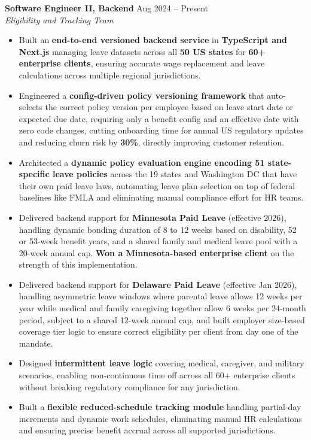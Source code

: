 \documentclass[11pt,a4paper]{article}
\begin{document}
\vspace{3pt}
\noindent\textbf{Software Engineer II, Backend} \hfill Aug 2024 -- Present \\
\textit{Eligibility and Tracking Team}\vspace{3pt}
\begin{itemize}[leftmargin=*, noitemsep, topsep=1pt, label={\small\textbullet}, itemsep=0pt]
\RaggedRight
    \item Built an \textbf{end-to-end versioned backend service} in \textbf{TypeScript and Next.js} managing leave datasets across all \textbf{50 US states} for \textbf{60+ enterprise clients}, ensuring accurate wage replacement and leave calculations across multiple regional jurisdictions.
    \item Engineered a \textbf{config-driven policy versioning framework} that auto-selects the correct policy version per employee based on leave start date or expected due date, requiring only a benefit config and an effective date with zero code changes, cutting onboarding time for annual US regulatory updates and reducing churn risk by \textbf{30\%}, directly improving customer retention.
    \item Architected a \textbf{dynamic policy evaluation engine encoding 51 state-specific leave policies} across the 19 states and Washington DC that have their own paid leave laws, automating leave plan selection on top of federal baselines like FMLA and eliminating manual compliance effort for HR teams.
    \item Delivered backend support for \textbf{Minnesota Paid Leave} (effective 2026), handling dynamic bonding duration of 8 to 12 weeks based on disability, 52 or 53-week benefit years, and a shared family and medical leave pool with a 20-week annual cap. \textbf{Won a Minnesota-based enterprise client} on the strength of this implementation.
    \item Delivered backend support for \textbf{Delaware Paid Leave} (effective Jan 2026), handling asymmetric leave windows where parental leave allows 12 weeks per year while medical and family caregiving together allow 6 weeks per 24-month period, subject to a shared 12-week annual cap, and built employer size-based coverage tier logic to ensure correct eligibility per client from day one of the mandate.
    \item Designed \textbf{intermittent leave logic} covering medical, caregiver, and military scenarios, enabling non-continuous time off across all 60+ enterprise clients without breaking regulatory compliance for any jurisdiction.
    \item Built a \textbf{flexible reduced-schedule tracking module} handling partial-day increments and dynamic work schedules, eliminating manual HR calculations and ensuring precise benefit accrual across all supported jurisdictions.
\end{itemize}
\end{document}
